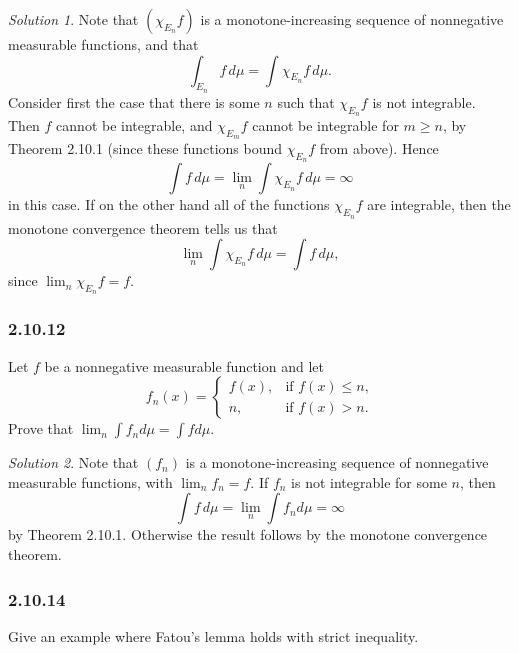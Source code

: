 \documentclass{report}
\theoremstyle{remark}
\newtheorem*{solution}{Solution}
\begin{document}
\begin{solution}
  Note that $(\chi_{E_n} f)$ is a monotone-increasing sequence of nonnegative measurable functions, and that
  \begin{equation*}
    \int_{E_n} f \, d\mu = \int \chi_{E_n} f \, d\mu.
  \end{equation*}
  Consider first the case that there is some $n$ such that $\chi_{E_n} f$ is not integrable. Then $f$ cannot be integrable, and $\chi_{E_m} f$ cannot be integrable for $m \ge n$, by Theorem 2.10.1 (since these functions bound $\chi_{E_n} f$ from above). Hence
  \begin{equation*}
    \int f \, d\mu = \lim_n \int \chi_{E_n} f \, d\mu = \infty
  \end{equation*}
  in this case. If on the other hand all of the functions $\chi_{E_n} f$ are integrable, then the monotone convergence theorem tells us that
  \begin{equation*}
    \lim_n \int \chi_{E_n} f \, d\mu = \int f \, d\mu,
  \end{equation*}
  since $ \lim_n \chi_{E_n} f = f$.
\end{solution}

\subsubsection*{2.10.12}
Let $f$ be a nonnegative measurable function and let
\begin{equation*}
  f_n(x) =
  \begin{cases}
    f(x), & \text{if $f(x) \le n$,} \\
    n, & \text{if $f(x) > n$.}
  \end{cases}
\end{equation*}
Prove that $\lim_n \int f_n d\mu = \int f d\mu$.

\begin{solution}
  Note that $(f_n)$ is a monotone-increasing sequence of nonnegative measurable functions, with $\lim_n f_n = f$. If $f_n$ is not integrable for some $n$, then
  \begin{equation*}
    \int f \, d\mu = \lim_n \int f_n d\mu = \infty
  \end{equation*}
  by Theorem 2.10.1. Otherwise the result follows by the monotone convergence theorem.
\end{solution}

\subsubsection*{2.10.14}
Give an example where Fatou's lemma holds with strict inequality.
\end{document}
